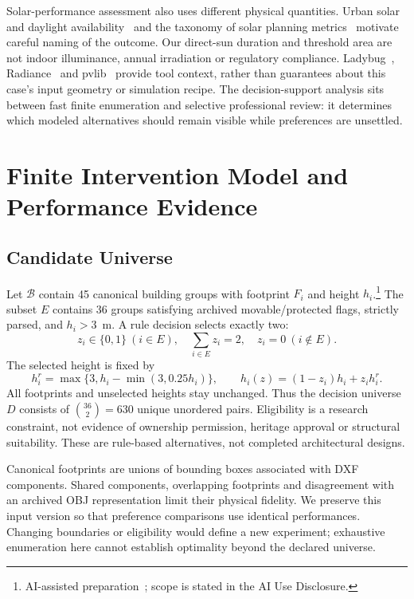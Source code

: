 \documentclass{llncs}
\newcommand{\aidraft}{\footnote{AI-assisted preparation~\cite{openai2026}; scope is stated in the AI Use Disclosure.}}
\begin{document}
Solar-performance assessment also uses different physical quantities. Urban solar and daylight availability~\cite{compagnon2004urban} and the taxonomy of solar planning metrics~\cite{czachura2022metrics} motivate careful naming of the outcome. Our direct-sun duration and threshold area are not indoor illuminance, annual irradiation or regulatory compliance. Ladybug~\cite{roudsari2013ladybug}, Radiance~\cite{ward1994radiance} and pvlib~\cite{holmgren2018pvlib} provide tool context, rather than guarantees about this case's input geometry or simulation recipe. The decision-support analysis sits between fast finite enumeration and selective professional review: it determines which modeled alternatives should remain visible while preferences are unsettled.

\section{Finite Intervention Model and Performance Evidence}
\subsection{Candidate Universe}
Let $\mathcal B$ contain 45 canonical building groups with footprint $F_i$ and height $h_i$.\aidraft{} The subset $E$ contains 36 groups satisfying archived movable/protected flags, strictly parsed, and $h_i>3$~m. A rule decision selects exactly two:
\begin{equation}
 z_i\in\{0,1\}\ (i\in E),\quad \sum_{i\in E}z_i=2,\quad z_i=0\ (i\notin E).
\label{eq:feasible}
\end{equation}
The selected height is fixed by
\begin{equation}
 h_i^r=\max\{3,h_i-\min(3,0.25h_i)\},\qquad
 h_i(z)=(1-z_i)h_i+z_i h_i^r.
\label{eq:height}
\end{equation}
All footprints and unselected heights stay unchanged. Thus the decision universe $D$ consists of $\binom{36}{2}=630$ unique unordered pairs. Eligibility is a research constraint, not evidence of ownership permission, heritage approval or structural suitability. These are rule-based alternatives, not completed architectural designs.

Canonical footprints are unions of bounding boxes associated with DXF components. Shared components, overlapping footprints and disagreement with an archived OBJ representation limit their physical fidelity. We preserve this input version so that preference comparisons use identical performances. Changing boundaries or eligibility would define a new experiment; exhaustive enumeration here cannot establish optimality beyond the declared universe.
\end{document}

